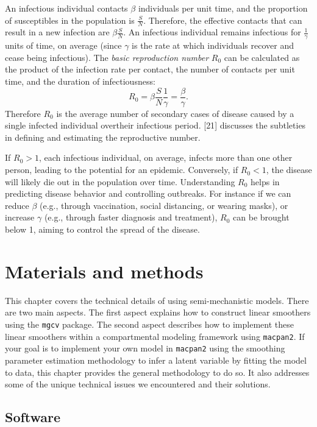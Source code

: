 \documentclass[
11pt, %
oneside, %
english, %
singlespacing, %
]{macthesis} %
\begin{document}
An infectious individual contacts \(\beta\) individuals per unit time, and the proportion of susceptibles in the population is \(\frac{S}{N}\). Therefore, the effective contacts that can result in a new infection are \(\beta \frac{S}{N}\). An infectious individual remains infectious for \(\frac{1}{\gamma}\) units of time, on average (since \(\gamma\) is the rate at which individuals recover and cease being infectious). The \emph{basic reproduction number} \(R_0\) can be calculated as the product of the infection rate per contact, the number of contacts per unit time, and the duration of infectiousness:
\[
   R_0 = \beta \frac{S}{N} \frac{1}{\gamma} = \frac{\beta}{\gamma}.
   \]
Therefore \(R_0\) is the average number of secondary cases of disease caused by a single infected individual overtheir infectious period. {[}21{]} discusses the subtleties in defining and estimating the reproductive number.

If \(R_0 > 1\), each infectious individual, on average, infects more than one other person, leading to the potential for an epidemic. Conversely, if \(R_0 < 1\), the disease will likely die out in the population over time. Understanding \(R_0\) helps in predicting disease behavior and controlling outbreaks. For instance if we can reduce \(\beta\) (e.g., through vaccination, social distancing, or wearing masks), or increase \(\gamma\) (e.g., through faster diagnosis and treatment), \(R_0\) can be brought below 1, aiming to control the spread of the disease.

\chapter{Materials and methods}\label{Materials-and-methods}

This chapter covers the technical details of using semi-mechanistic models. There are two main aspects. The first aspect explains how to construct linear smoothers using the \texttt{mgcv} package. The second aspect describes how to implement these linear smoothers within a compartmental modeling framework using \texttt{macpan2}. If your goal is to implement your own model in \texttt{macpan2} using the smoothing parameter estimation methodology to infer a latent variable by fitting the model to data, this chapter provides the general methodology to do so. It also addresses some of the unique technical issues we encountered and their solutions.

\section{Software}\label{Software}
\end{document}
